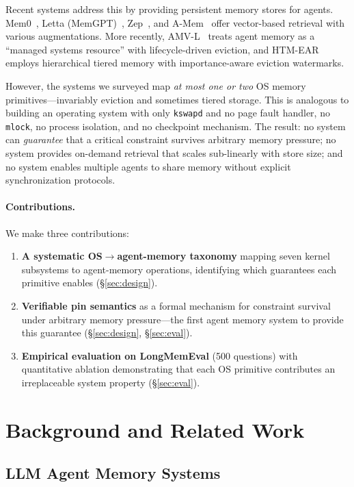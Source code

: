 \documentclass[10pt,twocolumn]{article}
\begin{document}
Recent systems address this by providing persistent memory stores for agents. Mem0~\cite{mem0}, Letta (MemGPT)~\cite{memgpt2023}, Zep~\cite{zep2024}, and A-Mem~\cite{amem2025} offer vector-based retrieval with various augmentations. More recently, AMV-L~\cite{amvl2026} treats agent memory as a ``managed systems resource'' with lifecycle-driven eviction, and HTM-EAR~\cite{htmear2026} employs hierarchical tiered memory with importance-aware eviction watermarks.

However, the systems we surveyed map \emph{at most one or two} OS memory primitives---invariably eviction and sometimes tiered storage. This is analogous to building an operating system with only \texttt{kswapd} and no page fault handler, no \texttt{mlock}, no process isolation, and no checkpoint mechanism. The result: no system can \emph{guarantee} that a critical constraint survives arbitrary memory pressure; no system provides on-demand retrieval that scales sub-linearly with store size; and no system enables multiple agents to share memory without explicit synchronization protocols.

\paragraph{Contributions.} We make three contributions:
\begin{enumerate}[leftmargin=*,nosep]
  \item \textbf{A systematic OS$\to$agent-memory taxonomy} mapping seven kernel subsystems to agent-memory operations, identifying which guarantees each primitive enables (\S\ref{sec:design}).
  \item \textbf{Verifiable pin semantics} as a formal mechanism for constraint survival under arbitrary memory pressure---the first agent memory system to provide this guarantee (\S\ref{sec:design}, \S\ref{sec:eval}).
  \item \textbf{Empirical evaluation on LongMemEval} (500 questions) with quantitative ablation demonstrating that each OS primitive contributes an irreplaceable system property (\S\ref{sec:eval}).
\end{enumerate}

\section{Background and Related Work}
\label{sec:related}

\subsection{LLM Agent Memory Systems}
\end{document}
